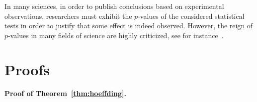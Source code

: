 In many sciences, in order to publish conclusions based on experimental observations, researchers must exhibit the $p$-values of the considered statistical tests in order to justify that some effect is indeed observed.
However, the reign of $p$-values in many fields of science are highly criticized, see for instance~.


\section{Proofs} %
\label{sec:chap03-proofs}


\paragraph{Proof of Theorem~\ref{thm:hoeffding}.} 

